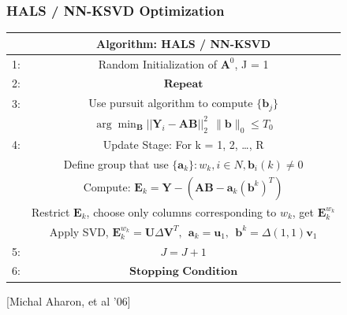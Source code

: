 \documentclass{beamer}
\begin{document}
\begin{frame}
\frametitle{HALS / NN-KSVD Optimization}

\begin{table}[h]
      \label{tab:KSVD} 
\centering
  \begin{tabular}{c || c |  }
        \hline
              & Algorithm: HALS / NN-KSVD \\ \hline \hline
    1: & Random Initialization of   $\mathbf{A}^0$, J = 1  \\ \hline
    2: & $\textbf{Repeat}$ \\ \hline
    3: &Use pursuit algorithm to compute  $\{\mathbf{b}_j\}$ \\  \hline
        &      $\arg\min_{\mathbf{B}} {||\mathbf{Y}_{i} - \mathbf{A} \mathbf{B}||}_{2}^2 \ \ \| \mathbf{b}\|_0  \le T_0$ \\  \hline
    4: & Update Stage: For k = 1, 2, \dots , R  \\  \hline   
        & Define group that use $ \{\mathbf{a}_k\}: w_k, i \in N,   \mathbf{b}_i(k) \neq 0$ \\  \hline
        & Compute: $\mathbf{E}_k=\mathbf{Y}-(\mathbf{AB}- \mathbf{a}_k (\mathbf{b}^k)^T)$ \\  \hline
        & Restrict $\mathbf{E}_k$, choose only columns corresponding to $w_k$, get $\mathbf{E}_k^{w_k}$ \\  \hline
        & Apply SVD, $\mathbf{E}_k^{w_k}=\mathbf{U} \Delta \mathbf{V}^T, \ \  \mathbf{a}_k= \mathbf{u}_1, \ \  \mathbf{b}^k= \Delta (1,1)   \mathbf{v}_1$    \\  \hline
    5: &     $J = J + 1$ \\ \hline
    6: & $\textbf{Stopping Condition}$ \\ \hline
    \hline
  \end{tabular}
\end{table}

[Michal Aharon, et al '06]

\end{frame}
\end{document}
